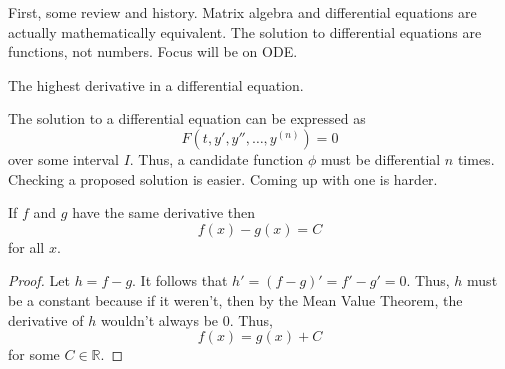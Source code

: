 \documentclass{article}[11, letterpaper]
\begin{document}

First, some review and history.
Matrix algebra and differential equations are actually mathematically equivalent.
The solution to differential equations are functions, not numbers.
Focus will be on ODE.

\begin{definition}[Order]
  The highest derivative in a differential equation.
\end{definition}

The solution to a differential equation can be expressed as
\[
  F(t, y', y'', \ldots, y^{(n)}) = 0
\]
over some interval $I$.
Thus, a candidate function $\phi$ must be differential $n$ times.
Checking a proposed solution is easier. Coming up with one is harder.

\begin{theorem}
  If $f$ and $g$ have the same derivative then
  \[
    f(x) - g(x) = C
  \]
  for all $x$.
\end{theorem}
\begin{proof}
  Let $h = f - g$.
  It follows that $h' = (f - g)' = f' - g' = 0$.
  Thus, $h$ must be a constant because if it weren't, then by the Mean Value Theorem, the derivative of $h$ wouldn't always be 0.
  Thus,
  \[
    f(x) = g(x) + C
  \]
  for some $C \in \mathbb{R}$.
\end{proof}
\end{document}
